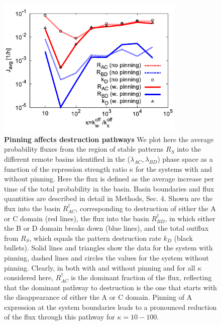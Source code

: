 \documentclass[10pt]{article}
\newcommand{\GA}{A\xspace}
\newcommand{\GB}{B\xspace}
\newcommand{\GC}{C\xspace}
\newcommand{\GD}{D\xspace}
\newcommand{\MM}{Methods, Sec. 4\xspace}
\begin{document}
\begin{figure}[ht!]
  \centering
  \includegraphics[width=0.8\textwidth]{Figures-SI/FigureFluxes.pdf}
\caption{\textbf{Pinning affects destruction pathways} 
    We plot here the average probability fluxes from the region of stable patterns $R_S$
    into the different remote basins identified in the ($\lambda_{AC},\lambda_{BD}$) phase space
    as a function of the repression strength ratio $\kappa$ for the systems with and without pinning.
    Here the flux is defined as the average increase per time of the total probability in the basin.
    Basin boundaries and flux quantities are described in detail in \MM.
    Shown are the flux into the basin $R^\dagger_{AC}$, corresponding to destruction of either the \GA or \GC domain (red lines),
    the flux into the basin $R^\dagger_{BD}$, in which either the \GB or \GD domain breaks down (blue lines),
    and the total outflux from $R_S$, which equals the pattern destruction rate $k_D$ (black bullets).    
    Solid lines and triangles show the data for the system with pinning, dashed lines and circles the values for
    the system without pinning.
    Clearly, in both with and without pinning and for all $\kappa$ considered here, $R^\dagger_{AC}$ is the dominant
    fraction of the flux, reflecting that the dominant pathway to destruction is the one that starts with the 
    disappearance of either the \GA or \GC domain.
    Pinning of \GA expression at the system boundaries leads to a pronounced reduction of the flux through this
    pathway for $\kappa=10 - 100$.
  \label{Fig-Fluxes}
}
\end{figure}

\clearpage
\end{document}

